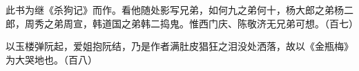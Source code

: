 \begin{showcontents}{}
{此书为继《杀狗记》而作。看他随处影写兄弟，如何九之弟何十，杨大郎之弟杨二郎，周秀之弟周宣，韩道国之弟韩二捣鬼。惟西门庆、陈敬济无兄弟可想。（百七）

以玉楼弹阮起，爱姐抱阮结，乃是作者满肚皮猖狂之泪没处洒落，故以《金瓶梅》为大哭地也。（百八）

} %






\end{showcontents}

